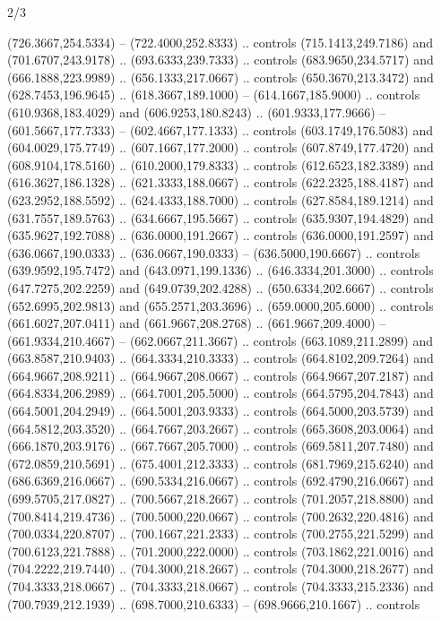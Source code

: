 \begin{flagdescription}{2/3}
\begin{scope}[xshift=0.5\flaglength,yshift=0.5\flagwidth,scale=\flagwidth/525.28]
\begin{scope}[y=0.1mm, x=0.1mm, yscale=-1,shift={(-381.5,-404)}]
\begin{scope}[shift={(5.25001,4.53053)},miter limit=4.00,line width=0.800\lw]
  (726.3667,254.5334) -- (722.4000,252.8333) .. controls (715.1413,249.7186) and
  (701.6707,243.9178) .. (693.6333,239.7333) .. controls (683.9650,234.5717) and
  (666.1888,223.9989) .. (656.1333,217.0667) .. controls (650.3670,213.3472) and
  (628.7453,196.9645) .. (618.3667,189.1000) -- (614.1667,185.9000) .. controls
  (610.9368,183.4029) and (606.9253,180.8243) .. (601.9333,177.9666) --
  (601.5667,177.7333) -- (602.4667,177.1333) .. controls (603.1749,176.5083) and
  (604.0029,175.7749) .. (607.1667,177.2000) .. controls (607.8749,177.4720) and
  (608.9104,178.5160) .. (610.2000,179.8333) .. controls (612.6523,182.3389) and
  (616.3627,186.1328) .. (621.3333,188.0667) .. controls (622.2325,188.4187) and
  (623.2952,188.5592) .. (624.4333,188.7000) .. controls (627.8584,189.1214) and
  (631.7557,189.5763) .. (634.6667,195.5667) .. controls (635.9307,194.4829) and
  (635.9627,192.7088) .. (636.0000,191.2667) .. controls (636.0000,191.2597) and
  (636.0667,190.0333) .. (636.0667,190.0333) -- (636.5000,190.6667) .. controls
  (639.9592,195.7472) and (643.0971,199.1336) .. (646.3334,201.3000) .. controls
  (647.7275,202.2259) and (649.0739,202.4288) .. (650.6334,202.6667) .. controls
  (652.6995,202.9813) and (655.2571,203.3696) .. (659.0000,205.6000) .. controls
  (661.6027,207.0411) and (661.9667,208.2768) .. (661.9667,209.4000) --
  (661.9334,210.4667) -- (662.0667,211.3667) .. controls (663.1089,211.2899) and
  (663.8587,210.9403) .. (664.3334,210.3333) .. controls (664.8102,209.7264) and
  (664.9667,208.9211) .. (664.9667,208.0667) .. controls (664.9667,207.2187) and
  (664.8334,206.2989) .. (664.7001,205.5000) .. controls (664.5795,204.7843) and
  (664.5001,204.2949) .. (664.5001,203.9333) .. controls (664.5000,203.5739) and
  (664.5812,203.3520) .. (664.7667,203.2667) .. controls (665.3608,203.0064) and
  (666.1870,203.9176) .. (667.7667,205.7000) .. controls (669.5811,207.7480) and
  (672.0859,210.5691) .. (675.4001,212.3333) .. controls (681.7969,215.6240) and
  (686.6369,216.0667) .. (690.5334,216.0667) .. controls (692.4790,216.0667) and
  (699.5705,217.0827) .. (700.5667,218.2667) .. controls (701.2057,218.8800) and
  (700.8414,219.4736) .. (700.5000,220.0667) .. controls (700.2632,220.4816) and
  (700.0334,220.8707) .. (700.1667,221.2333) .. controls (700.2755,221.5299) and
  (700.6123,221.7888) .. (701.2000,222.0000) .. controls (703.1862,221.0016) and
  (704.2222,219.7440) .. (704.3000,218.2667) .. controls (704.3000,218.2677) and
  (704.3333,218.0667) .. (704.3333,218.0667) .. controls (704.3333,215.2336) and
  (700.7939,212.1939) .. (698.7000,210.6333) -- (698.9666,210.1667) .. controls

\end{scope}
\end{scope}
\end{scope}
\end{flagdescription}
